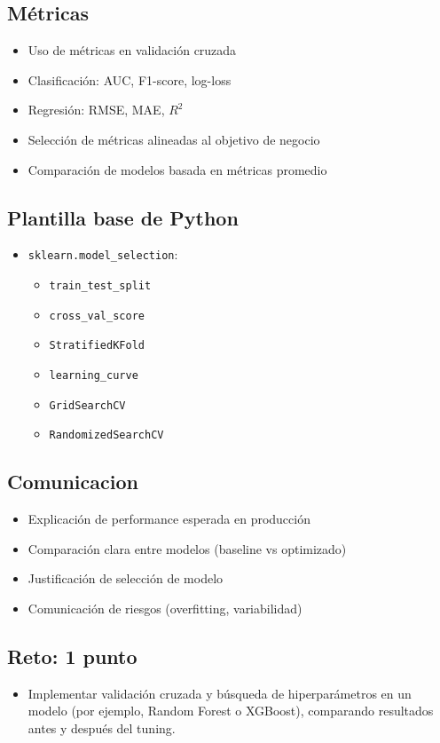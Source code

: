 \documentclass[12pt,a4paper,openany,oneside]{book}
\begin{document}
\begin{itemize}
\subsection{Métricas}
\begin{itemize}
    \item Uso de métricas en validación cruzada
    \item Clasificación: AUC, F1-score, log-loss
    \item Regresión: RMSE, MAE, $R^2$
    \item Selección de métricas alineadas al objetivo de negocio
    \item Comparación de modelos basada en métricas promedio
\end{itemize}

\subsection{Plantilla base de Python}
\begin{itemize}
    \item \texttt{sklearn.model\_selection}:
    \begin{itemize}
        \item \texttt{train\_test\_split}
        \item \texttt{cross\_val\_score}
        \item \texttt{StratifiedKFold}
        \item \texttt{learning\_curve}
        \item \texttt{GridSearchCV}
        \item \texttt{RandomizedSearchCV}
    \end{itemize}
\end{itemize}

\subsection{Comunicacion}
\begin{itemize}
    \item Explicación de performance esperada en producción
    \item Comparación clara entre modelos (baseline vs optimizado)
    \item Justificación de selección de modelo
    \item Comunicación de riesgos (overfitting, variabilidad)
\end{itemize}

\subsection{Reto: 1 punto}
\begin{itemize}
    \item Implementar validación cruzada y búsqueda de hiperparámetros en un modelo (por ejemplo, Random Forest o XGBoost), comparando resultados antes y después del tuning.
\end{itemize}


\end{itemize}
\end{document}
